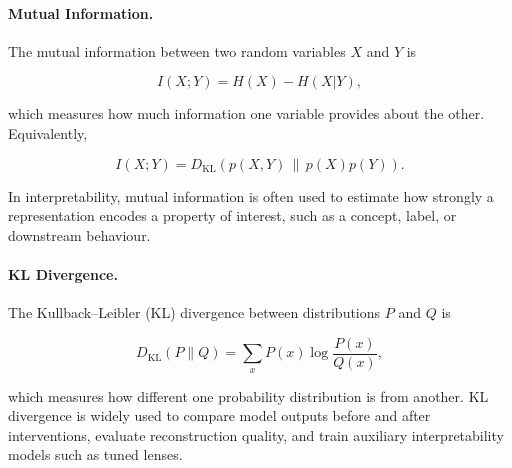 \paragraph{Mutual Information.} The mutual information between two random variables $X$ and $Y$ is

\[
I(X;Y) = H(X)-H(X|Y),
\]

which measures how much information one variable provides about the other. Equivalently,

\[
I(X;Y)=D_{\mathrm{KL}}(p(X,Y)\,\|\,p(X)p(Y)).
\]

In interpretability, mutual information is often used to estimate how strongly a representation encodes a property of interest, such as a concept, label, or downstream behaviour.

\paragraph{KL Divergence.} The Kullback--Leibler (KL) divergence between distributions $P$ and $Q$ is

\[
D_{\mathrm{KL}}(P\|Q)
=
\sum_x P(x)\log\frac{P(x)}{Q(x)},
\]

which measures how different one probability distribution is from another. KL divergence is widely used to compare model outputs before and after interventions, evaluate reconstruction quality, and train auxiliary interpretability models such as tuned lenses.



    
    
    
    
    


\clearpage
